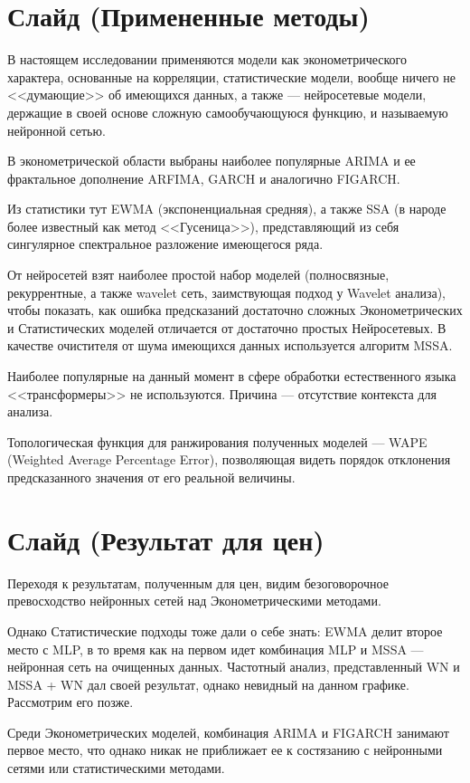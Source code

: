 \documentclass[a4paper, 12pt]{article}
\begin{document}
	\section{Слайд (Примененные методы)}
		В настоящем исследовании применяются модели как эконометрического характера, основанные на корреляции, статистические модели, вообще ничего не <<думающие>> об имеющихся данных, а также --- нейросетевые модели, держащие в своей основе сложную самообучающуюся функцию, и называемую нейронной сетью. 
		
		В эконометрической области выбраны наиболее популярные ARIMA и ее фрактальное дополнение ARFIMA, GARCH и аналогично FIGARCH.
		
		Из статистики тут EWMA (экспоненциальная средняя), а также SSA (в народе более известный как метод <<Гусеница>>), представляющий из себя сингулярное спектральное разложение имеющегося ряда.
		
		От нейросетей взят наиболее простой набор моделей (полносвязные, рекуррентные, а также wavelet сеть, заимствующая подход у Wavelet анализа), чтобы показать, как ошибка предсказаний достаточно сложных Эконометрических и Статистических моделей отличается от достаточно простых Нейросетевых. В качестве очистителя от шума имеющихся данных используется алгоритм MSSA.
		
		Наиболее популярные на данный момент в сфере обработки естественного языка <<трансформеры>> не используются. Причина --- отсутствие контекста для анализа.
		
		Топологическая функция для ранжирования полученных моделей --- WAPE (Weighted Average Percentage Error), позволяющая видеть порядок отклонения предсказанного значения от его реальной величины.
	\section{Слайд (Результат для цен)}
		Переходя к результатам, полученным для цен, видим безоговорочное превосходство нейронных сетей над Эконометрическими методами. 
		
		Однако Статистические подходы тоже дали о себе знать: EWMA делит второе место с MLP, в то время как на первом идет комбинация MLP и MSSA --- нейронная сеть на очищенных данных. Частотный анализ, представленный WN и MSSA + WN дал своей результат, однако невидный на данном графике. Рассмотрим его позже.

		Среди Эконометрических моделей, комбинация ARIMA и FIGARCH занимают первое место, что однако никак не приближает ее к состязанию с нейронными сетями или статистическими методами.
		 
\end{document}
